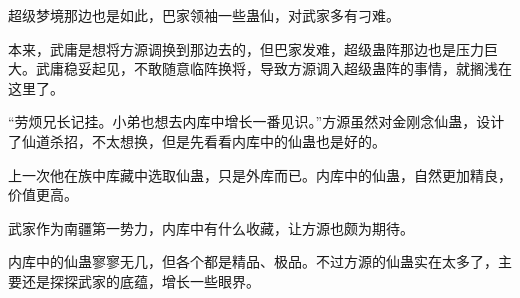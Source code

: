 \begin{this_body}
超级梦境那边也是如此，巴家领袖一些蛊仙，对武家多有刁难。

本来，武庸是想将方源调换到那边去的，但巴家发难，超级蛊阵那边也是压力巨大。武庸稳妥起见，不敢随意临阵换将，导致方源调入超级蛊阵的事情，就搁浅在这里了。

“劳烦兄长记挂。小弟也想去内库中增长一番见识。”方源虽然对金刚念仙蛊，设计了仙道杀招，不太想换，但是先看看内库中的仙蛊也是好的。

上一次他在族中库藏中选取仙蛊，只是外库而已。内库中的仙蛊，自然更加精良，价值更高。

武家作为南疆第一势力，内库中有什么收藏，让方源也颇为期待。

内库中的仙蛊寥寥无几，但各个都是精品、极品。不过方源的仙蛊实在太多了，主要还是探探武家的底蕴，增长一些眼界。

\end{this_body}

